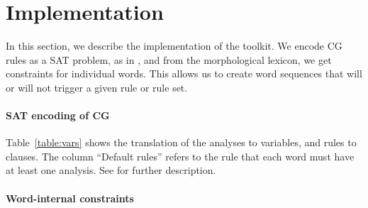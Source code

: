 
\section{Implementation}
\label{sec:implementation}

In this section, we describe the implementation of the toolkit.
We encode CG rules as a SAT problem, as in \cite{listenmaa_claessen2015}, and from the morphological lexicon, we get constraints for individual words. This allows us to create word sequences that will or will not trigger a given rule or rule set.

\paragraph{SAT encoding of CG}

Table~\ref{table:vars} shows the translation of the analyses to variables, and rules to clauses. The column ``Default rules'' refers to the rule that each word must have at least one analysis.
See \cite{listenmaa_claessen2015} for further description.




\paragraph{Word-internal constraints}

